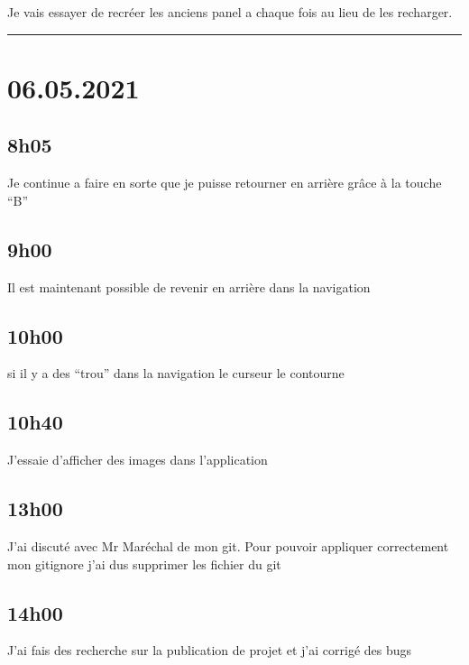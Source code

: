 \documentclass[a4paper,12pt,french]{sphinxmanual}
\begin{document}
\sphinxAtStartPar
Je vais essayer de recréer les anciens panel a chaque fois au lieu de les recharger.


\bigskip\hrule\bigskip



\section{06.05.2021}
\label{\detokenize{logbook:id76}}

\subsection{8h05}
\label{\detokenize{logbook:id77}}
\sphinxAtStartPar
Je continue a faire en sorte que je puisse retourner en arrière grâce à la touche “B”


\subsection{9h00}
\label{\detokenize{logbook:id78}}
\sphinxAtStartPar
Il est maintenant possible de revenir en arrière dans la navigation


\subsection{10h00}
\label{\detokenize{logbook:id79}}
\sphinxAtStartPar
si il y a des “trou” dans la navigation le curseur le contourne


\subsection{10h40}
\label{\detokenize{logbook:id80}}
\sphinxAtStartPar
J’essaie d’afficher des images dans l’application


\subsection{13h00}
\label{\detokenize{logbook:id81}}
\sphinxAtStartPar
J’ai discuté avec Mr Maréchal de mon git. Pour pouvoir appliquer correctement mon gitignore j’ai dus supprimer les fichier du git


\subsection{14h00}
\label{\detokenize{logbook:id82}}
\sphinxAtStartPar
J’ai fais des recherche sur la publication de projet et j’ai corrigé des bugs
\end{document}

